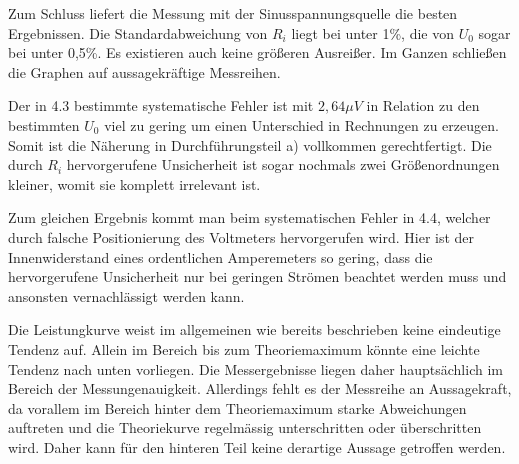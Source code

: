 Zum Schluss liefert die Messung mit der Sinusspannungsquelle die besten Ergebnissen.
Die Standardabweichung von $R_i$ liegt bei unter 1\%, die von $U_0$ sogar bei unter 0,5\%.
 Es existieren auch keine größeren Ausreißer.
 Im Ganzen schließen die Graphen auf aussagekräftige Messreihen.

Der in 4.3 bestimmte systematische Fehler ist mit $2,64\mu V$ in Relation zu den bestimmten $U_0$ viel zu gering
um einen Unterschied in Rechnungen zu erzeugen. Somit ist die Näherung in Durchführungsteil a)
 vollkommen gerechtfertigt. Die durch $R_i$ hervorgerufene Unsicherheit ist sogar nochmals
 zwei Größenordnungen kleiner, womit sie komplett irrelevant ist.

 Zum gleichen Ergebnis kommt man beim systematischen Fehler in 4.4, welcher durch falsche Positionierung des Voltmeters hervorgerufen wird.
Hier ist der Innenwiderstand eines ordentlichen Amperemeters so gering, dass die hervorgerufene Unsicherheit nur bei geringen Strömen
beachtet werden muss und ansonsten vernachlässigt werden kann.

Die Leistungkurve weist im allgemeinen wie bereits beschrieben keine eindeutige Tendenz auf. Allein im Bereich bis zum Theoriemaximum
könnte eine leichte Tendenz nach unten vorliegen. Die Messergebnisse liegen daher hauptsächlich
 im Bereich der Messungenauigkeit. Allerdings fehlt es der Messreihe an Aussagekraft, da vorallem im Bereich
  hinter dem Theoriemaximum starke Abweichungen auftreten und die Theoriekurve regelmässig
  unterschritten oder überschritten wird. Daher kann für den hinteren Teil keine derartige Aussage getroffen werden.
